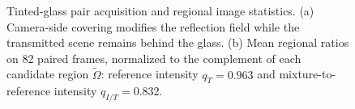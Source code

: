\begin{figure}[t]
\caption{Tinted-glass pair acquisition and regional image statistics.
(a) Camera-side covering modifies the reflection field while the
transmitted scene remains behind the glass.
(b) Mean regional ratios on 82 paired frames, normalized to the
complement of each candidate region $\tilde\Omega$:
reference intensity $q_T=0.963$ and mixture-to-reference intensity
$q_{I/T}=0.832$.}
\label{fig:omega}
\end{figure}
